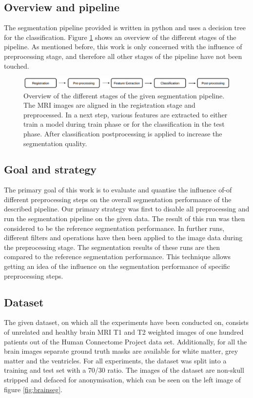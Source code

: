 \documentclass[journal]{IEEEtran}
\begin{document}
\subsection{Overview and pipeline}
The segmentation pipeline provided is written in python and uses a decision tree for the classification. Figure \ref{fig:pipeline} shows an overview of the different stages of the pipeline. As mentioned before, this work is only concerned with the influence of preprocessing stage, and therefore all other stages of the pipeline have not been touched.
\begin{figure}[!t]
\centering
\includegraphics[width=\linewidth]{img/pipeline}
\caption{Overview of the different stages of the given segmentation pipeline. The MRI images are aligned in the registration stage and preprocessed. In a next step, various features are extracted to either train a model during train phase or for the classification in the test phase. After classification postprocessing is applied to increase the segmentation quality.}
\label{fig:pipeline}
\end{figure}

\subsection{Goal and strategy}
The primary goal of this work is to evaluate and quantise the influence of-of different preprocessing steps on the overall segmentation performance of the described pipeline. Our primary strategy was first to disable all preprocessing and run the segmentation pipeline on the given data. The result of this run was then considered to be the reference segmentation performance. In further runs, different filters and operations have then been applied to the image data during the preprocessing stage. The segmentation results of these runs are then compared to the reference segmentation performance. This technique allows getting an idea of the influence on the segmentation performance of specific preprocessing steps.

\subsection{Dataset}
The given dataset, on which all the experiments have been conducted on, consists of unrelated and healthy brain MRI T1 and T2 weighted images of one hundred patients out of the Human Connectome Project data set. Additionally, for all the brain images separate ground truth masks are available for white matter, grey matter and the ventricles. For all experiments, the dataset was split into a training and test set with a 70/30 ratio. The images of the dataset are non-skull stripped and defaced for anonymisation, which can be seen on the left image of figure \ref{fig:brainseg}.
\end{document}
